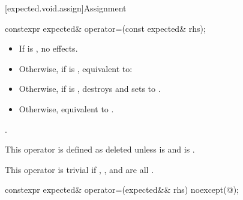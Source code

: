 [expected.void.assign]{Assignment}

%
\begin{itemdecl}
constexpr expected& operator=(const expected& rhs);
\end{itemdecl}

\begin{itemdescr}
\pnum
\effects
\begin{itemize}
\item
If  is , no effects.
\item
Otherwise, if  is ,
equivalent to: 
\item
Otherwise, if  is ,
destroys  and sets  to .
\item
Otherwise, equivalent to .
\end{itemize}

\pnum
\returns
{}.

\pnum
\remarks
This operator is defined as deleted unless
 is  and
 is .

\pnum
This operator is trivial if
,
, and
are all .
\end{itemdescr}

%
\begin{itemdecl}
constexpr expected& operator=(expected&& rhs) noexcept(@\seebelow@);
\end{itemdecl}

